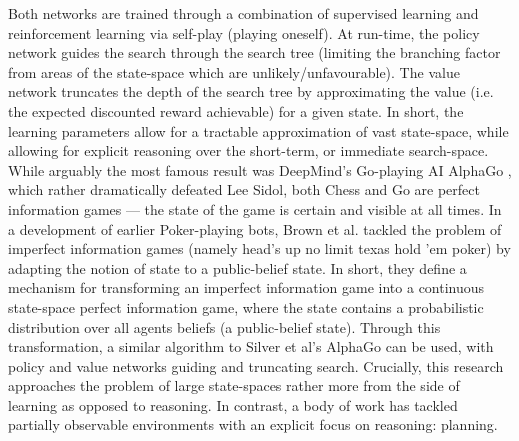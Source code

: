 \newline \newline 
Both networks are trained through a combination of supervised learning and reinforcement learning via self-play (playing oneself). At run-time, the policy network guides the search through the search tree (limiting the branching factor from areas of the state-space which are unlikely/unfavourable). The value network truncates the depth of the search tree by approximating the value (i.e. the expected discounted reward achievable) for a given state. In short, the learning parameters allow for a tractable approximation of vast state-space, while allowing for explicit reasoning over the short-term, or immediate search-space. 
\newline \newline
While arguably the most famous result was DeepMind's Go-playing AI AlphaGo \cite{AlphaGo}, which rather dramatically defeated Lee Sidol, both Chess and Go are perfect information games --- the state of the game is certain and visible at all times. In a development of earlier Poker-playing bots, Brown et al. \cite{Brown2020} tackled the problem of imperfect information games (namely head's up no limit texas hold 'em poker) by adapting the notion of state to a public-belief state. In short, they define a mechanism for transforming an imperfect information game into a continuous state-space perfect information game, where the state contains a probabilistic distribution over all agents beliefs (a public-belief state). Through this transformation, a similar algorithm to Silver et al's AlphaGo can be used, with policy and value networks guiding and truncating search.   
\newline \newline
Crucially, this research approaches the problem of large state-spaces rather more from the side of learning as opposed to reasoning. In contrast, a body of work has tackled partially observable environments with an explicit focus on reasoning: planning.  


